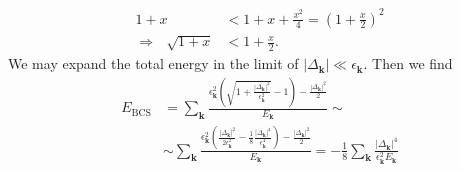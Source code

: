 \documentclass[english, parskip=full]{scrartcl}
\newcommand{\kla}{}
\newcommand{\tecxt}{}
\begin{document}
\begin{align}
1 + x &< 1+ x + \frac{x^2}{4} = \kla\left( 1 + \frac{x}{2} \right)^2\\
\Rightarrow\ \ \ \sqrt{1 + x} &< 1 + \frac{x}{2}.
\end{align}
We may expand the total energy in the limit of $|\Delta_\textbf{k}| \ll \epsilon_\textbf{k}$.
Then we find
\begin{align}
E_\tecxt\text{BCS} &= \sum_\textbf{k} \frac{\epsilon_\textbf{k}^2 \kla\left( \sqrt{1 + \frac{|\Delta_\textbf{k}|^2}{\epsilon_\textbf{k}^2}} - 1 \right) - \frac{|\Delta_\textbf{k}|^2}{2}}{E_\textbf{k}} \sim \\
&\sim \sum_\textbf{k}  \frac{\epsilon_\textbf{k}^2 \kla\left( \frac{|\Delta_\textbf{k}|^2}{2\epsilon_\textbf{k}^2} - \frac{1}{8} \frac{|\Delta_\textbf{k}|^4}{\epsilon_\textbf{k}^4} \right) - \frac{|\Delta_\textbf{k}|^2}{2}}{E_\textbf{k}} = -\frac{1}{8} \sum_\textbf{k} \frac{|\Delta_\textbf{k}|^4}{\epsilon_\textbf{k}^2 E_\textbf{k}}
\end{align}
\end{document}
